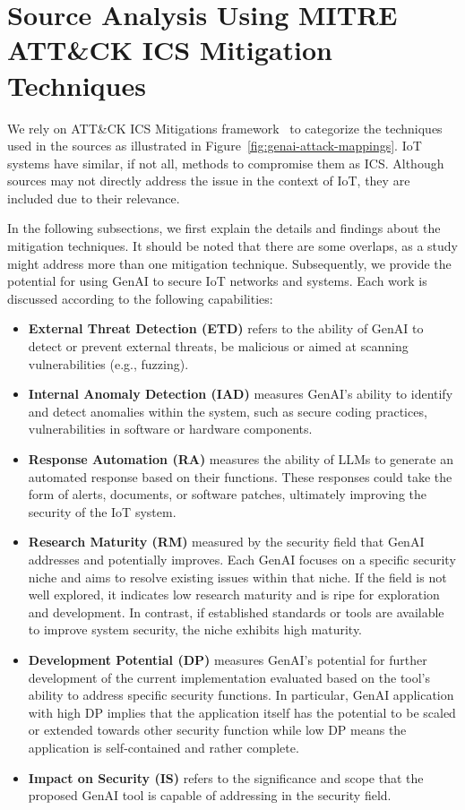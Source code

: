\section{Source Analysis Using MITRE ATT\&CK ICS Mitigation Techniques}
\label{sec:detection}
%
We rely on ATT\&CK ICS Mitigations framework~\citet{icsmitre} to categorize the techniques used in the sources as illustrated in Figure~\ref{fig:genai-attack-mappings}.
IoT systems have similar, if not all, methods to compromise them as ICS.
Although sources may not directly address the issue in the context of IoT, they are included due to their relevance.

In the following subsections, we first explain the details and findings about the mitigation techniques.
It should be noted that there are some overlaps, as a study might address more than one mitigation technique.
Subsequently, we provide the potential for using GenAI to secure IoT networks and systems.
Each work is discussed according to the following capabilities:
%
\begin{itemize}
%
\item \textbf{External Threat Detection (ETD)} refers to the ability of GenAI to detect or prevent external threats, be malicious or aimed at scanning vulnerabilities (e.g., fuzzing).

\item \textbf{Internal Anomaly Detection (IAD)} measures GenAI's ability to identify and detect anomalies within the system, such as secure coding practices, vulnerabilities in software or hardware components.

\item \textbf{Response Automation (RA)} measures the ability of LLMs to generate an automated response based on their functions.
These responses could take the form of alerts, documents, or software patches, ultimately improving the security of the IoT system.

\item \textbf{Research Maturity (RM)} measured by the security field that GenAI addresses and potentially improves.
Each GenAI focuses on a specific security niche and aims to resolve existing issues within that niche.
If the field is not well explored, it indicates low research maturity and is ripe for exploration and development.
In contrast, if established standards or tools are available to improve system security, the niche exhibits high maturity.

\item \textbf{Development Potential (DP)} measures GenAI's potential for further development of the current implementation evaluated based on the tool's ability to address specific security functions.
In particular, GenAI application with high DP implies that the application itself has the potential to be scaled or extended towards other security function while low DP means the application is self-contained and rather complete.

\item \textbf{Impact on Security (IS)} refers to the significance and scope that the proposed GenAI tool is capable of addressing in the security field.
%
\end{itemize}
